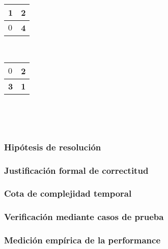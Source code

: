 \documentclass[11pt, a4paper, twoside]{article}
\begin{document}
\begin{minipage}{0.5\textwidth}
	\centering
	\begin{tabular}{ | l | l |}
		\hline 
		\textbf{1}  & \textbf{2} \\ 
		\hline 
		$0$  & \textbf{4} \\ 
		\hline
	\end{tabular}  \\
\end{minipage}
\begin{minipage}{0.5\textwidth}
	\begin{tabular}{ | l | l |}
		\hline 
		$0$     & \textbf{2} \\ 
		\hline 
		\textbf{3}  & \textbf{1} \\ 
		\hline
	\end{tabular} \\
\end{minipage}  \\

\subsubsection{Hipótesis de resolución}

\subsubsection{Justificación formal de correctitud}

\subsubsection{Cota de complejidad temporal}

\subsubsection{Verificación mediante casos de prueba}



\subsubsection{Medición empírica de la performance}

\end{document}
